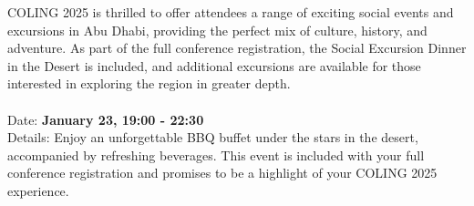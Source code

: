 COLING 2025 is thrilled to offer attendees a range of exciting social events and excursions in Abu Dhabi, providing the perfect mix of culture, history, and adventure. As part of the full conference registration, the Social Excursion Dinner in the Desert is included, and additional excursions are available for those interested in exploring the region in greater depth.\\

\\
 Date: \textbf{January 23, 19:00 - 22:30}\\
 Details: Enjoy an unforgettable BBQ buffet under the stars in the desert, accompanied by refreshing beverages. This event is included with your full conference registration and promises to be a highlight of your COLING 2025 experience.\\

